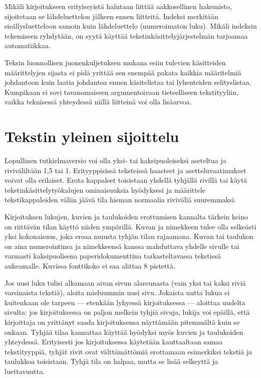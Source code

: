 Mikäli kirjoitukseen erityissyistä halutaan
liittää aakkosellinen hakemisto, sijoitetaan se lähdeluettelon jälkeen
ennen liitteitä. Indeksi merkitään sisällysluetteloon samoin kuin
lähdeluettelo (numeroimaton luku). Mikäli indeksin tekemiseen
ryhdytään, on syytä käyttää tekstinkäsittelyjärjestelmän tarjoamaa
automatiikkaa.

Teksin luonnollisen juonenkuljetuksen mukana esiin
tulevien käsitteiden määrittelyjen sijasta ei pidä yrittää sen enempää
pakata kaikkia määritelmiä johdantoon kuin laatia johdantoa ennen
käsitelistaa tai lyhenteiden selityslistaa. Kumpikaan ei sovi
tavanomaiseen argumentoivaan tieteelliseen tekstityyliin, vaikka
teknisessä yhteydessä niillä liitteinä voi olla lisäarvoa.


\section{Tekstin yleinen sijoittelu}

Lopullinen tutkielmaversio voi olla yksi- tai kaksipuoleiseksi aseteltua
ja riviväliltään 1,5 tai 1.  Erityyppisissä
teksteissä haasteet ja asetteluvaatimukset voivat olla erilaiset. Erota
kappaleet toisistaan yhdellä tyhjällä rivillä tai
käytä tekstinkäsittelytyökalujen ominaisuuksia
hyödyksesi ja määrittele tekstikappaleiden väliin jäävä tila hieman
normaalia riviväliä suuremmaksi.

Kirjoituksen lukujen, kuvien ja taulukoiden erottumisen kannalta
tärkein keino on riittävän tilan käyttö niiden ympärillä. Kuvan ja
nimekkeen tulee olla selkeästi yksi kokonaisuus, joka eroaa muusta
tyhjän tilan rajaamana. Kuvan tai taulukon on aina numerointinsa ja
nimekkeensä kanssa mahduttava yhdelle sivulle tai varmasti
kaksipuolisena paperidokumenttina tarkasteltavassa tekstissä aukeamalle.
Kuvissa fonttikoko ei saa alittaa 8 pistettä.



Jos uusi luku tulisi alkamaan aivan sivun alareunasta (vain yksi tai
kaksi riviä varsinaista tekstiä), aloita mieluummin uusi sivu. Jokaista
uutta lukua ei kuitenkaan ole tarpeen --- etenkään lyhyessä
kirjoituksessa --- aloittaa uudelta sivulta: jos kirjoituksessa on
paljon melkein tyhjiä sivuja, lukija voi epäillä, että kirjoittaja on
yrittänyt saada kirjoituksensa näyttämään pitemmältä kuin se onkaan. 
 Tyhjää tilaa kannattaa käyttää hyödyksi myös kuvien ja taulukoiden
yhteydessä. Erityisesti jos kirjoituksessa käytetään kauttaaltaan samaa
tekstityyppiä, tyhjät rivit ovat välttämättömiä erottamaan esimerkiksi
tekstiä ja taulukkoa toisistaan. Tyhjä tila on halpaa, mutta se lisää
selkeyttä ja luettavuutta.  


